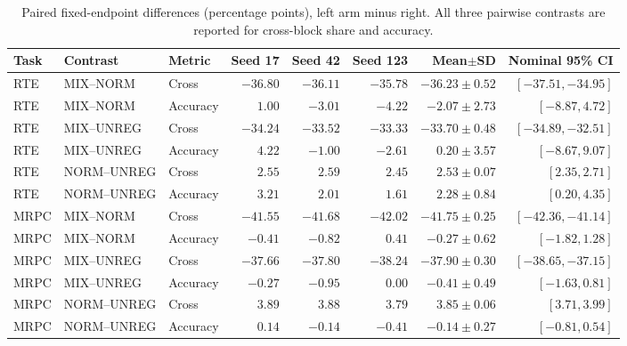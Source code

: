 \documentclass{article}
\begin{document}
\begin{table}[t]
\centering
\caption{Paired fixed-endpoint differences (percentage points), left arm minus right. All three pairwise contrasts are reported for cross-block share and accuracy.}
\label{tab:focusedpaired}
\begin{adjustbox}{max width=\linewidth}
\begin{tabular}{lllrrrrr}
\toprule
Task & Contrast & Metric & Seed 17 & Seed 42 & Seed 123 & Mean$\pm$SD & Nominal 95\% CI\\
\midrule
RTE & MIX--NORM & Cross & $-36.80$ & $-36.11$ & $-35.78$ & $-36.23 \pm 0.52$ & $[-37.51, -34.95]$ \\
RTE & MIX--NORM & Accuracy & $1.00$ & $-3.01$ & $-4.22$ & $-2.07 \pm 2.73$ & $[-8.87, 4.72]$ \\
RTE & MIX--UNREG & Cross & $-34.24$ & $-33.52$ & $-33.33$ & $-33.70 \pm 0.48$ & $[-34.89, -32.51]$ \\
RTE & MIX--UNREG & Accuracy & $4.22$ & $-1.00$ & $-2.61$ & $0.20 \pm 3.57$ & $[-8.67, 9.07]$ \\
RTE & NORM--UNREG & Cross & $2.55$ & $2.59$ & $2.45$ & $2.53 \pm 0.07$ & $[2.35, 2.71]$ \\
RTE & NORM--UNREG & Accuracy & $3.21$ & $2.01$ & $1.61$ & $2.28 \pm 0.84$ & $[0.20, 4.35]$ \\
\midrule
MRPC & MIX--NORM & Cross & $-41.55$ & $-41.68$ & $-42.02$ & $-41.75 \pm 0.25$ & $[-42.36, -41.14]$ \\
MRPC & MIX--NORM & Accuracy & $-0.41$ & $-0.82$ & $0.41$ & $-0.27 \pm 0.62$ & $[-1.82, 1.28]$ \\
MRPC & MIX--UNREG & Cross & $-37.66$ & $-37.80$ & $-38.24$ & $-37.90 \pm 0.30$ & $[-38.65, -37.15]$ \\
MRPC & MIX--UNREG & Accuracy & $-0.27$ & $-0.95$ & $0.00$ & $-0.41 \pm 0.49$ & $[-1.63, 0.81]$ \\
MRPC & NORM--UNREG & Cross & $3.89$ & $3.88$ & $3.79$ & $3.85 \pm 0.06$ & $[3.71, 3.99]$ \\
MRPC & NORM--UNREG & Accuracy & $0.14$ & $-0.14$ & $-0.41$ & $-0.14 \pm 0.27$ & $[-0.81, 0.54]$ \\
\bottomrule
\end{tabular}
\end{adjustbox}
\end{table}
\end{document}
